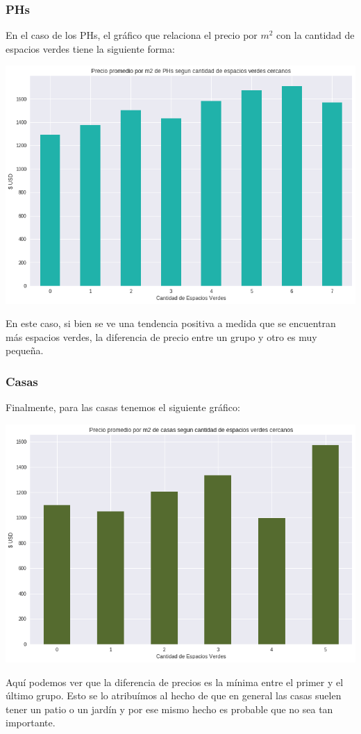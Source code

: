 \documentclass[a4paper, 10pt]{article}
\newcommand\tab[1][0.5cm]{\hspace*{#1}}
\begin{document}
			\subsubsection{PHs}
				En el caso de los PHs, el gráfico que relaciona el precio por $m^2$ con la cantidad de espacios verdes tiene la 
				siguiente forma:
				\begin{center}
					\includegraphics[width=\textwidth]{images/parksImpactPH}
				\end{center}
				\tab En este caso, si bien se ve una tendencia positiva a medida que se encuentran más espacios verdes, la diferencia
				de precio entre un grupo y otro es muy pequeña.
			\subsubsection{Casas}
				Finalmente, para las casas tenemos el siguiente gráfico:
				\begin{center}
					\includegraphics[width=\textwidth]{images/parksImpactHouses}
				\end{center}
				\tab Aquí podemos ver que la diferencia de precios es la mínima entre el primer y el último grupo. Esto se lo
				atribuímos al hecho de que en general las casas suelen tener un patio o un jardín y por ese mismo hecho es probable
				que no sea tan importante. 
\end{document}
